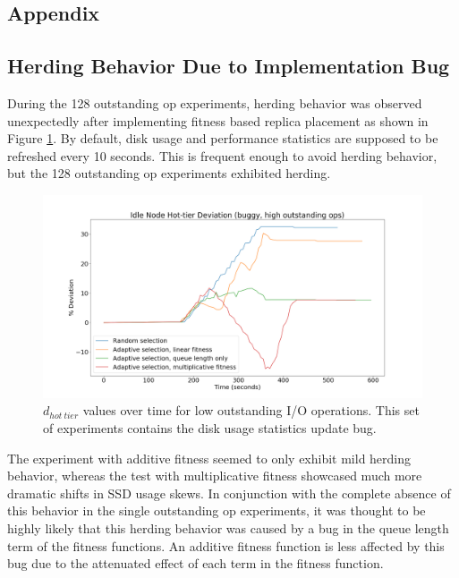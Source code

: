 \documentclass[12pt]{article}
\begin{document}
\newpage
\FloatBarrier
\begin{appendices}
\appendix
\section{Appendix}

  \subsection{Herding Behavior Due to Implementation Bug}

  During the 128 outstanding op experiments, herding behavior
  was observed unexpectedly after implementing fitness based replica placement
  as shown in Figure \ref{fig:herding_bug}. By default, disk usage and
  performance statistics are supposed to be refreshed every 10 seconds. This is
  frequent enough to avoid herding behavior, but the 128 outstanding op
  experiments exhibited herding.

  \begin{figure}[htbp]
    \centering
    \includegraphics[scale=0.30]{images/buggy.png} 
    \caption{$d_{hot\ tier}$ values over time for low outstanding I/O
             operations. This set of experiments contains the disk usage statistics update bug.}
    \label{fig:herding_bug}
  \end{figure}

  The experiment with additive fitness seemed to only exhibit mild herding
  behavior, whereas the test with multiplicative fitness showcased much more
  dramatic shifts in SSD usage skews. In conjunction with the complete absence
  of this behavior in the single outstanding op experiments, it was thought to
  be highly likely that this herding behavior was caused by a bug in the queue
  length term of the fitness functions. An additive fitness function is less
  affected by this bug due to the attenuated effect of each term in the fitness
  function.


\end{appendices}
\end{document}
